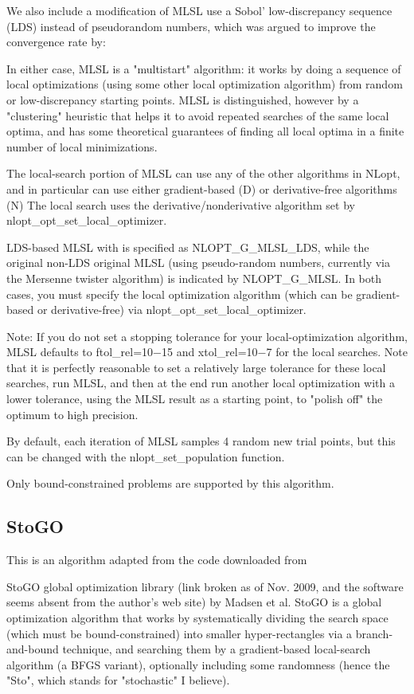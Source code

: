We also include a modification of MLSL use a Sobol' low-discrepancy sequence (LDS) instead of pseudorandom numbers, which was argued to improve the convergence rate by: \cite{Kucherenko_2005}


In either case, MLSL is a "multistart" algorithm: it works by doing a sequence of local optimizations (using some other local optimization algorithm) from random or low-discrepancy starting points. MLSL is distinguished, however by a "clustering" heuristic that helps it to avoid repeated searches of the same local optima, and has some theoretical guarantees of finding all local optima in a finite number of local minimizations. 

The local-search portion of MLSL can use any of the other algorithms in NLopt, and in particular can use either gradient-based (D) or derivative-free algorithms (N) The local search uses the derivative/nonderivative algorithm set by nlopt\_opt\_set\_local\_optimizer. 

LDS-based MLSL with is specified as NLOPT\_G\_MLSL\_LDS, while the original non-LDS original MLSL (using pseudo-random numbers, currently via the Mersenne twister algorithm) is indicated by NLOPT\_G\_MLSL. In both cases, you must specify the local optimization algorithm (which can be gradient-based or derivative-free) via nlopt\_opt\_set\_local\_optimizer. 

Note: If you do not set a stopping tolerance for your local-optimization algorithm, MLSL defaults to ftol\_rel=10−15 and xtol\_rel=10−7 for the local searches. Note that it is perfectly reasonable to set a relatively large tolerance for these local searches, run MLSL, and then at the end run another local optimization with a lower tolerance, using the MLSL result as a starting point, to "polish off" the optimum to high precision. 

By default, each iteration of MLSL samples 4 random new trial points, but this can be changed with the nlopt\_set\_population function. 

Only bound-constrained problems are supported by this algorithm. 




\subsection{StoGO}
This is an algorithm adapted from the code downloaded from 

StoGO global optimization library (link broken as of Nov. 2009, and the software seems absent from the author's web site) 
by Madsen et al. StoGO is a global optimization algorithm that works by systematically dividing the search space (which must be bound-constrained) into smaller hyper-rectangles via a branch-and-bound technique, and searching them by a gradient-based local-search algorithm (a BFGS variant), optionally including some randomness (hence the "Sto", which stands for "stochastic" I believe). 

